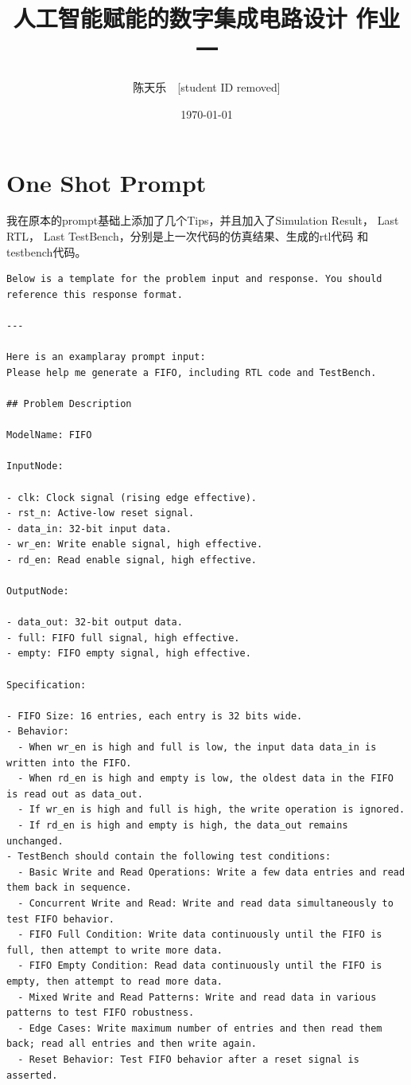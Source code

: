 \documentclass[UTF8]{ctexart}
\title{\textbf{人工智能赋能的数字集成电路设计 作业一}}
\author{陈天乐\ \ [student ID removed] }
\date{\today}
\begin{document}
\maketitle
\tableofcontents
\newpage
\section{One Shot Prompt}

我在原本的prompt基础上添加了几个Tips，并且加入了Simulation Result， Last RTL， Last TestBench，分别是上一次代码的仿真结果、生成的rtl代码
和testbench代码。

\begin{lstlisting}[frame=shadowbox]
Below is a template for the problem input and response. You should reference this response format.

---

Here is an examplaray prompt input:
Please help me generate a FIFO, including RTL code and TestBench.

## Problem Description

ModelName: FIFO

InputNode:

- clk: Clock signal (rising edge effective).
- rst_n: Active-low reset signal.
- data_in: 32-bit input data.
- wr_en: Write enable signal, high effective.
- rd_en: Read enable signal, high effective.

OutputNode:

- data_out: 32-bit output data.
- full: FIFO full signal, high effective.
- empty: FIFO empty signal, high effective.

Specification:

- FIFO Size: 16 entries, each entry is 32 bits wide.
- Behavior:
  - When wr_en is high and full is low, the input data data_in is written into the FIFO.
  - When rd_en is high and empty is low, the oldest data in the FIFO is read out as data_out.
  - If wr_en is high and full is high, the write operation is ignored.
  - If rd_en is high and empty is high, the data_out remains unchanged.
- TestBench should contain the following test conditions:
  - Basic Write and Read Operations: Write a few data entries and read them back in sequence.
  - Concurrent Write and Read: Write and read data simultaneously to test FIFO behavior.
  - FIFO Full Condition: Write data continuously until the FIFO is full, then attempt to write more data.
  - FIFO Empty Condition: Read data continuously until the FIFO is empty, then attempt to read more data.
  - Mixed Write and Read Patterns: Write and read data in various patterns to test FIFO robustness.
  - Edge Cases: Write maximum number of entries and then read them back; read all entries and then write again.
  - Reset Behavior: Test FIFO behavior after a reset signal is asserted.



\end{lstlisting}
\end{document}
